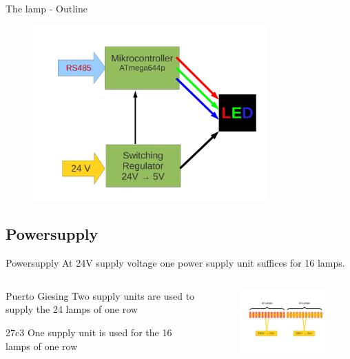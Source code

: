 \documentclass{beamer}
\begin{document}
  \begin{frame}{The lamp - Outline}
    \begin{figure}
    \begin{center}
    \includegraphics[width=9cm]{bilder/led_12v_rs485.pdf}
    \end{center}
    \end{figure}
  \end{frame}
\subsection{Powersupply}
  \begin{frame}{Powersupply}
  At 24V supply voltage one power supply unit suffices for 16 lamps.
  \begin{columns}
    \begin{column}{4cm}
     \begin{block}{ Puerto Giesing}
     Two supply units are used to supply the 24 lamps of one row
     \end{block}
     \begin{block}{27c3}
     One supply unit is used for the 16 lamps of one row
     \end{block}
    \end{column}
    \begin{column}{7cm}
    \begin{figure}
    \includegraphics[width=7cm, clip, trim= 2.5cm 4.6cm 0.5cm 4cm]{bilder/12lampen.pdf}
    \end{figure}
    \end{column}
  \end{columns}
  \end{frame}
\end{document}
